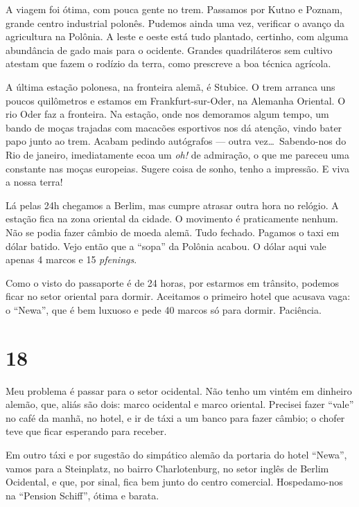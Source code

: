 A viagem foi ótima, com pouca gente no trem. Passamos por Kutno e Poznam, grande centro industrial polonês. Pudemos ainda uma vez, verificar o avanço da agricultura na Polônia. A leste e oeste está tudo plantado, certinho, com alguma abundância de gado mais para o ocidente. Grandes quadriláteros sem cultivo atestam que fazem o rodízio da terra, como prescreve a boa técnica agrícola.

A última estação polonesa, na fronteira alemã, é Stubice. O trem arranca uns poucos quilômetros e estamos em Frankfurt-sur-Oder, na Alemanha Oriental. O rio Oder faz a fronteira. Na estação, onde nos demoramos algum tempo, um bando de moças trajadas com macacões esportivos nos dá atenção, vindo bater papo junto ao trem. Acabam pedindo autógrafos --- outra vez\ldots\ Sabendo-nos do Rio de janeiro, imediatamente ecoa um \textit{oh!} de admiração, o que me pareceu uma constante nas moças europeias. Sugere coisa de sonho, tenho a impressão. E viva a nossa terra!

Lá pelas 24h chegamos a Berlim, mas cumpre atrasar outra hora no relógio. A estação fica na zona oriental da cidade. O movimento é praticamente nenhum. Não se podia fazer câmbio de moeda alemã. Tudo fechado. Pagamos o taxi em dólar batido. Vejo então que a ``sopa'' da Polônia acabou. O dólar aqui vale apenas 4 marcos e 15 \textit{pfenings}.

Como o visto do passaporte é de 24 horas, por estarmos em trânsito, podemos ficar no setor oriental para dormir. Aceitamos o primeiro hotel que acusava vaga: o ``Newa'', que é bem luxuoso e pede 40 marcos só para dormir. Paciência.

\section*{18 \adfflatleafright {}}
Meu problema é passar para o setor ocidental. Não tenho um vintém em dinheiro alemão, que, aliás são dois: marco ocidental e marco oriental. Precisei fazer ``vale'' no café da manhã, no hotel, e ir de táxi a um banco para fazer câmbio; o chofer teve que ficar esperando para receber.

Em outro táxi e por sugestão do simpático alemão da portaria do hotel ``Newa'', vamos para a Steinplatz, no bairro Charlotenburg, no setor inglês de Berlim Ocidental, e que, por sinal, fica bem junto do centro comercial. Hospedamo-nos na ``Pension Schiff'', ótima e barata.

